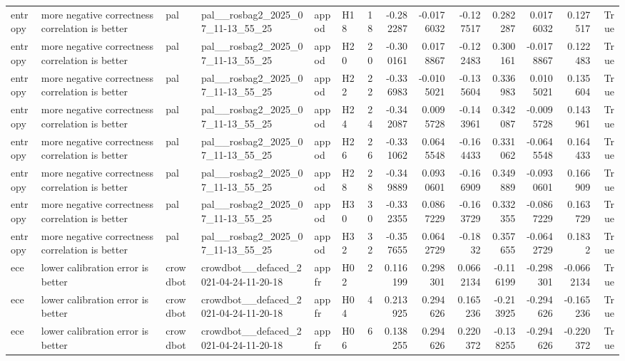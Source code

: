\begin{longtable}{llllllrrrrrrrr}
entropy & more negative correctness correlation is better & pal & pal\_\_rosbag2\_2025\_07\_11-13\_55\_25 & appod & H18 & 18 & -0.282287 & -0.0176032 & -0.127517 & 0.282287 & 0.0176032 & 0.127517 & True \\
entropy & more negative correctness correlation is better & pal & pal\_\_rosbag2\_2025\_07\_11-13\_55\_25 & appod & H20 & 20 & -0.300161 & 0.0178867 & -0.122483 & 0.300161 & -0.0178867 & 0.122483 & True \\
entropy & more negative correctness correlation is better & pal & pal\_\_rosbag2\_2025\_07\_11-13\_55\_25 & appod & H22 & 22 & -0.336983 & -0.0105021 & -0.135604 & 0.336983 & 0.0105021 & 0.135604 & True \\
entropy & more negative correctness correlation is better & pal & pal\_\_rosbag2\_2025\_07\_11-13\_55\_25 & appod & H24 & 24 & -0.342087 & 0.0095728 & -0.143961 & 0.342087 & -0.0095728 & 0.143961 & True \\
entropy & more negative correctness correlation is better & pal & pal\_\_rosbag2\_2025\_07\_11-13\_55\_25 & appod & H26 & 26 & -0.331062 & 0.0645548 & -0.164433 & 0.331062 & -0.0645548 & 0.164433 & True \\
entropy & more negative correctness correlation is better & pal & pal\_\_rosbag2\_2025\_07\_11-13\_55\_25 & appod & H28 & 28 & -0.349889 & 0.0930601 & -0.166909 & 0.349889 & -0.0930601 & 0.166909 & True \\
entropy & more negative correctness correlation is better & pal & pal\_\_rosbag2\_2025\_07\_11-13\_55\_25 & appod & H30 & 30 & -0.332355 & 0.0867229 & -0.163729 & 0.332355 & -0.0867229 & 0.163729 & True \\
entropy & more negative correctness correlation is better & pal & pal\_\_rosbag2\_2025\_07\_11-13\_55\_25 & appod & H32 & 32 & -0.357655 & 0.0642729 & -0.1832 & 0.357655 & -0.0642729 & 0.1832 & True \\
ece & lower calibration error is better & crowdbot & crowdbot\_\_defaced\_2021-04-24-11-20-18 & appfr & H02 & 2 & 0.116199 & 0.298301 & 0.0662134 & -0.116199 & -0.298301 & -0.0662134 & True \\
ece & lower calibration error is better & crowdbot & crowdbot\_\_defaced\_2021-04-24-11-20-18 & appfr & H04 & 4 & 0.213925 & 0.294626 & 0.165236 & -0.213925 & -0.294626 & -0.165236 & True \\
ece & lower calibration error is better & crowdbot & crowdbot\_\_defaced\_2021-04-24-11-20-18 & appfr & H06 & 6 & 0.138255 & 0.294626 & 0.220372 & -0.138255 & -0.294626 & -0.220372 & True \\

\end{longtable}
